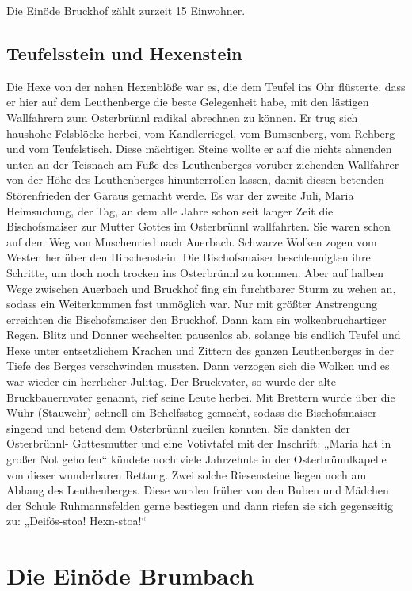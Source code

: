 \documentclass{book}
\begin{document}
Die Einöde Bruckhof zählt zurzeit 15 Einwohner.

\subsection{Teufelsstein und Hexenstein}

Die Hexe von der nahen Hexenblöße war es, die dem Teufel ins Ohr
flüsterte, dass er hier auf dem Leuthenberge die beste Gelegenheit habe,
mit den lästigen Wallfahrern zum Osterbrünnl radikal abrechnen zu
können. Er trug sich haushohe Felsblöcke herbei, vom Kandlerriegel, vom
Bumsenberg, vom Rehberg und vom Teufelstisch. Diese mächtigen Steine
wollte er auf die nichts ahnenden unten an der Teisnach am Fuße des
Leuthenberges vorüber ziehenden Wallfahrer von der Höhe des
Leuthenberges hinunterrollen lassen, damit diesen betenden Störenfrieden
der Garaus gemacht werde. Es war der zweite Juli, Maria Heimsuchung, der
Tag, an dem alle Jahre schon seit langer Zeit die Bischofsmaiser zur
Mutter Gottes im Osterbrünnl wallfahrten. Sie waren schon auf dem Weg
von Muschenried nach Auerbach. Schwarze Wolken zogen vom Westen her über
den Hirschenstein. Die Bischofsmaiser beschleunigten ihre Schritte, um
doch noch trocken ins Osterbrünnl zu kommen. Aber auf halben Wege
zwischen Auerbach und Bruckhof fing ein furchtbarer Sturm zu wehen an,
sodass ein Weiterkommen fast unmöglich war. Nur mit größter Anstrengung
erreichten die Bischofsmaiser den Bruckhof. Dann kam ein
wolkenbruchartiger Regen. Blitz und Donner wechselten pausenlos ab,
solange bis endlich Teufel und Hexe unter entsetzlichem Krachen und
Zittern des ganzen Leuthenberges in der Tiefe des Berges verschwinden
mussten. Dann verzogen sich die Wolken und es war wieder ein herrlicher
Julitag. Der Bruckvater, so wurde der alte Bruckbauernvater genannt,
rief seine Leute herbei. Mit Brettern wurde über die Wühr (Stauwehr)
schnell ein Behelfssteg gemacht, sodass die Bischofsmaiser singend und
betend dem Osterbrünnl zueilen konnten. Sie dankten der Osterbrünnl-
Gottesmutter und eine Votivtafel mit der Inschrift: „Maria hat in großer
Not geholfen“ kündete noch viele Jahrzehnte in der Osterbrünnlkapelle
von dieser wunderbaren Rettung. Zwei solche Riesensteine liegen noch am
Abhang des Leuthenberges. Diese wurden früher von den Buben und Mädchen
der Schule Ruhmannsfelden gerne bestiegen und dann riefen sie sich
gegenseitig zu: „Deifös-stoa! Hexn-stoa!“

\section{Die Einöde Brumbach}
\end{document}
